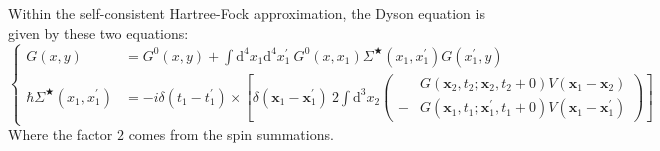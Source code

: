 Within the self-consistent Hartree-Fock approximation, the Dyson equation is given by these two equations:
\[ \left \{ \begin{aligned}
G(x,y)&= G^{0}(x,y) + \int \mathrm{d}^{4}x_{1} \mathrm{d}^{4}x_{1}^{'} \ G^{0}(x,x_{1}) \Sigma^{\bigstar}%
(x_{1},x_{1}^{'})G(x_{1}^{'},y)\\
\hbar \Sigma^{\bigstar}
(x_{1},x_{1}^{'})&= -i \delta(t_{1}-t_{1}^{'}) \times 
\left[ \delta(\mathbf{x}_{1}-\mathbf{x}_{1}^{'}) \ 2 \int \mathrm{d}^{3}x_{2} \left( \begin{aligned} &G(\mathbf{x}_{2},t_{2};\mathbf{x}_{2},t_{2}+0) V(\mathbf{x}_{1}-\mathbf{x}_{2})
\\- &G(\mathbf{x}_{1},t_{1};\mathbf{x}_{1}^{'},t_{1}+0) V(\mathbf{x}_{1}-\mathbf{x}_{1}^{'}) \end{aligned}\right)
\right]
\end{aligned}\right. \]
Where the factor $2$ comes from the spin summations.

